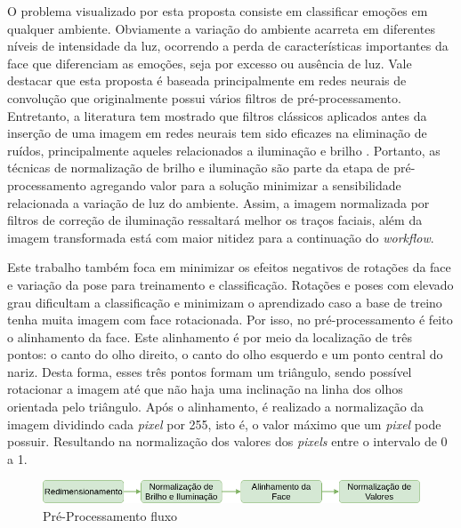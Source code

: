 O problema visualizado por esta proposta consiste em classificar emoções em qualquer ambiente. Obviamente a variação do ambiente acarreta em diferentes níveis de intensidade da luz, ocorrendo a perda de características importantes da face que diferenciam as emoções, seja por excesso ou ausência de luz. Vale destacar que esta proposta é baseada principalmente em redes neurais de convolução que originalmente possui vários filtros de pré-processamento. Entretanto, a literatura tem mostrado que filtros clássicos aplicados antes da inserção de uma imagem em redes neurais tem sido eficazes na eliminação de ruídos, principalmente aqueles relacionados a iluminação e brilho \citep{art2,art4,art6}. Portanto, as técnicas de normalização de brilho e iluminação são parte da etapa de pré-processamento agregando valor para a solução minimizar a sensibilidade relacionada a variação de luz do ambiente. Assim, a imagem normalizada por filtros de correção de iluminação ressaltará melhor os traços faciais, além da imagem transformada está com maior nitidez para a continuação do \textit{workflow}.

Este trabalho também foca em minimizar os efeitos negativos de rotações da face e variação da pose para treinamento e classificação. Rotações e poses com elevado grau dificultam a classificação e minimizam o aprendizado caso a base de treino tenha muita imagem com face rotacionada. Por isso, no pré-processamento é feito o alinhamento da face. Este alinhamento é por meio da localização de três pontos: o canto do olho direito, o canto do olho esquerdo e um ponto central do nariz. Desta forma, esses três pontos formam um triângulo, sendo possível rotacionar a imagem até que não haja uma inclinação na linha dos olhos orientada pelo triângulo. Após o alinhamento, é realizado a normalização da imagem dividindo cada \textit{pixel} por 255, isto é, o valor máximo que um \textit{pixel} pode possuir. Resultando na normalização dos valores dos \textit{pixels} entre o intervalo de 0 a 1. 

\begin{figure}
\centering
\includegraphics[scale=0.5]{figuras/PreProcessamentoMestrado.png}
\caption{Pré-Processamento fluxo}
\label{fig:preprocessingfluxo}
\end{figure}



